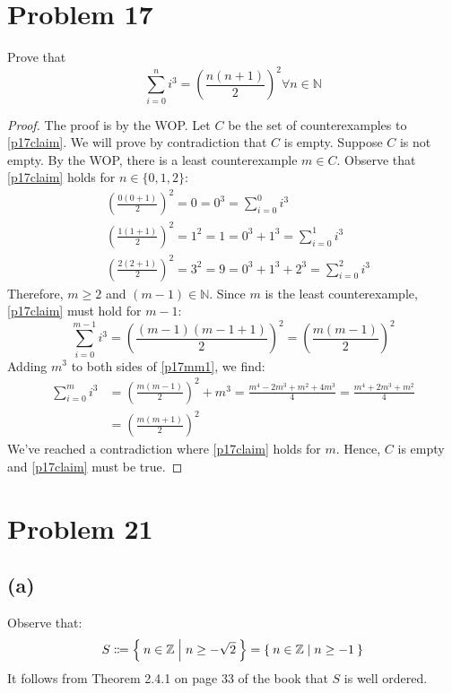 \documentclass{article}
\begin{document}
\pagebreak

\section{Problem 17}
Prove that
\begin{equation}\label{p17claim}
	\sum_{i=0}^n i^3 = \left( \frac{n(n+1)}{2} \right)^2 \forall n \in \mathbb{N}
\end{equation}
\begin{proof}
	The proof is by the WOP. Let $C$ be the set of counterexamples to \eqref{p17claim}. We will prove by contradiction that $C$ is empty. Suppose $C$ is not empty. By the WOP, there is a least counterexample $m \in C$. Observe that \eqref{p17claim} holds for $n \in \{0, 1, 2\}$:
	\begin{align*}
		 & \left( \frac{0(0+1)}{2} \right)^2 = 0 = 0^3 = \sum_{i=0}^0 i^3                   \\
		 & \left( \frac{1(1+1)}{2} \right)^2 = 1^2 = 1 = 0^3 + 1^3 = \sum_{i=0}^1 i^3       \\
		 & \left( \frac{2(2+1)}{2} \right)^2 = 3^2 = 9 = 0^3 + 1^3 + 2^3 = \sum_{i=0}^2 i^3
	\end{align*}
	Therefore, $m \ge 2$ and $(m - 1) \in \mathbb{N}$. Since $m$ is the least counterexample, \eqref{p17claim} must hold for $m - 1$:
	\begin{equation}\label{p17mm1}
		\sum_{i=0}^{m-1} i^3 = \left( \frac{(m-1)(m-1+1)}{2} \right)^2 = \left( \frac{m(m-1)}{2} \right)^2
	\end{equation}
	Adding $m^3$ to both sides of \eqref{p17mm1}, we find:
	\begin{align*}
		\sum_{i=0}^m i^3 & = \left( \frac{m(m-1)}{2} \right)^2 + m^3 = \frac{m^4 - 2m^3 + m^2 + 4m^3}{4} = \frac{m^4 + 2m^3 + m^2}{4} \\ &= \left( \frac{m(m+1)}{2} \right)^2
	\end{align*}
	We've reached a contradiction where \eqref{p17claim} holds for $m$. Hence, $C$ is empty and \eqref{p17claim} must be true.
\end{proof}

\pagebreak

\section{Problem 21}

\subsection{(a)}
Observe that:
\[
	S \Coloneqq \Set{n \in \mathbb{Z} | n \geq -\sqrt{2}} = \Set{n \in \mathbb{Z} | n \geq -1}
\]
It follows from Theorem 2.4.1 on page 33 of the book that $S$ is well ordered.
\end{document}
